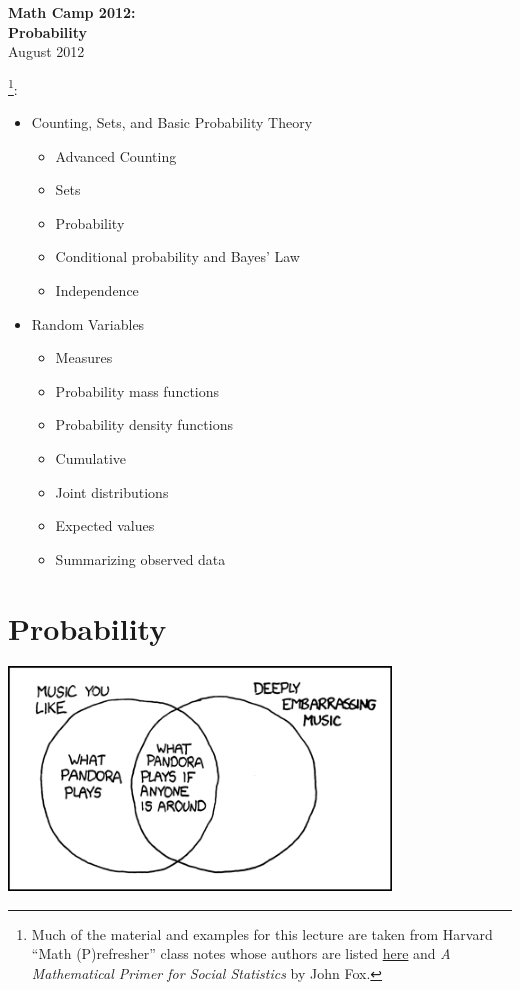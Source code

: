 \documentclass[20pt]{extarticle}
\newcommand{\bi}{\begin{itemize}}
\newcommand{\ei}{\end{itemize}}
\newcommand{\noi}{\noindent}
\begin{document}
\pagestyle{myheadings}
\parskip=6pt
\thispagestyle{empty}
\renewcommand{\thefootnote}{\fnsymbol{footnote}}

\begin{centering}
{\Large \bf Math Camp 2012:\\[9pt]
Probability}\\[18pt]
August 2012\\[36pt]
\end{centering}


\noi {\bf Topics}\footnote{Much of the material and examples for
this lecture are taken from Harvard ``Math (P)refresher'' class notes
whose authors are listed
\href{http://people.hmdc.harvard.edu/~mathpre/mathnotes/lectures/index.html}{here}
and \textit{A Mathematical Primer for Social Statistics} by John Fox.}:
\bi
  \item Counting, Sets, and Basic Probability Theory 
\bi
  \item Advanced Counting
  \item Sets
  \item Probability
  \item Conditional probability and Bayes' Law
   \item Independence 
\ei
\item Random Variables
\bi
\item Measures
\item Probability mass functions 
\item Probability density functions
\item Cumulative
\item Joint distributions
\item Expected values
\item Summarizing observed data
\ei  
\ei

\newpage

\section{Probability}

\begin{center}
\includegraphics[width=4in]{pandora}
\end{center}
\end{document}
